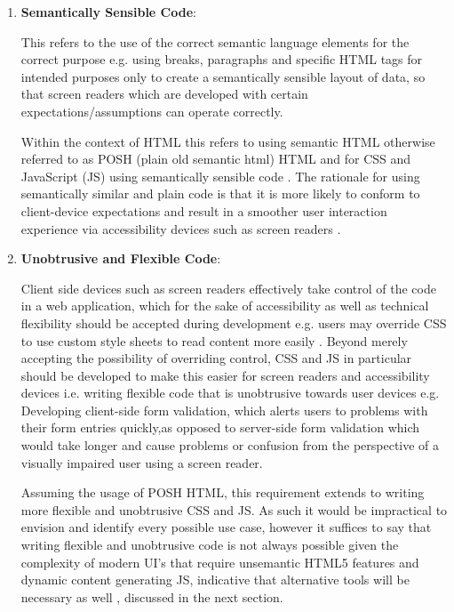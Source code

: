 \begin{enumerate}
    \item \textbf{Semantically Sensible Code}:
    
    This refers to the use of the correct semantic language elements for the correct purpose e.g. using breaks, paragraphs and specific HTML tags for intended purposes only \cite{Mills,Mills2017} to create a semantically sensible layout of data, so that screen readers which are developed with certain expectations/assumptions can operate correctly.
    
    Within the context of HTML this refers to using semantic HTML otherwise referred to as POSH (plain old semantic html) HTML \cite{Mills2017} and for CSS and JavaScript (JS) using semantically sensible code \cite{Mills}. The rationale for using semantically similar and plain code is that it is more likely to conform to client-device expectations and result in a smoother user interaction experience via accessibility devices such as screen readers \cite{Mills2017,Mills}.
    
    \item \textbf{Unobtrusive and Flexible Code}:
    
    Client side devices such as screen readers effectively take control of the code in a web application, which for the sake of accessibility as well as technical flexibility should be accepted during development e.g. users may override CSS to use custom style sheets to read content more easily \cite{Mills}. Beyond merely accepting the possibility of overriding control, CSS and JS in particular should be developed to make this easier for screen readers and accessibility devices \cite{Mills,Mills2017,Sukardi2016} i.e. writing flexible code that is unobtrusive towards user devices e.g. Developing client-side form validation, which alerts users to problems with their form entries quickly,as opposed to server-side form validation which would take longer and cause problems or confusion from the perspective of a visually impaired user using a screen reader. 
    
    Assuming the usage of POSH HTML, this requirement extends to writing more flexible and unobtrusive CSS and JS. As such it would be impractical to envision and identify every possible use case, however it suffices to say that writing flexible and unobtrusive code is not always possible given the complexity of modern UI's that require unsemantic HTML5 features and dynamic content generating JS, indicative that alternative tools will be necessary as well \cite{Mills,Sukardi2016}, discussed in the next section.



\end{enumerate}

